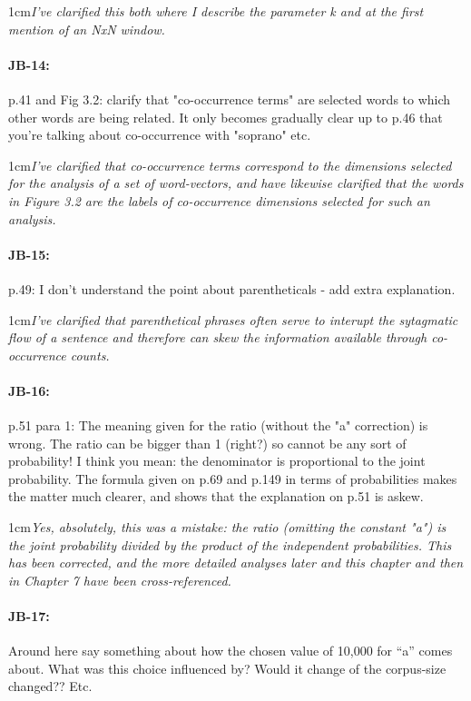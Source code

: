 \documentclass[11pt,a4paper]{article}
\newcommand{\res}[1]{\vspace{0.25cm} \begin{adjustwidth}{1cm}{}\emph{#1}\end{adjustwidth}}
\begin{document}
\res{I've clarified this both where I describe the parameter k and at the first mention of an NxN window.}

\paragraph{JB-14:} p.41 and Fig 3.2: clarify that "co-occurrence terms" are selected words to which other words are being related. It only becomes gradually clear up to p.46 that you're talking about co-occurrence with "soprano" etc.

\res{I've clarified that co-occurrence terms correspond to the dimensions selected for the analysis of a set of word-vectors, and have likewise clarified that the words in Figure 3.2 are the labels of co-occurrence dimensions selected for such an analysis.}

\paragraph{JB-15:} p.49: I don't understand the point about parentheticals - add extra explanation.

\res{I've clarified that parenthetical phrases often serve to interupt the sytagmatic flow of a sentence and therefore can skew the information available through co-occurrence counts.}

\paragraph{JB-16:} p.51 para 1: The meaning given for the ratio (without the "a" correction) is wrong. The ratio can be bigger than 1 (right?) so cannot be any sort of probability! I think you mean: the denominator is proportional to the joint probability. The formula given on p.69 and p.149 in terms of probabilities makes the matter much clearer, and shows that the explanation on p.51 is askew.

\res{Yes, absolutely, this was a mistake: the ratio (omitting the constant "a") is the joint probability divided by the product of the independent probabilities.  This has been corrected, and the more detailed analyses later and this chapter and then in Chapter 7 have been cross-referenced.}

\paragraph{JB-17:} Around here say something about how the chosen value of 10,000 for ``a'' comes about. What was this choice influenced by? Would it change of the corpus-size changed?? Etc.
\end{document}
